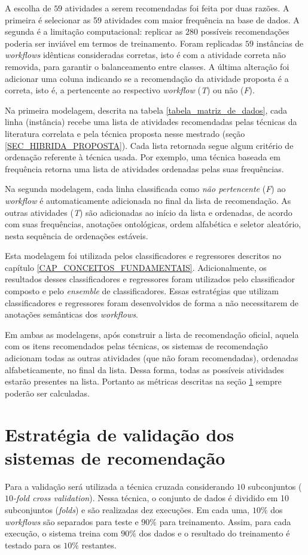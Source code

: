 A escolha de \(59\) atividades a serem recomendadas foi feita por duas razões. A primeira é selecionar as 59 atividades com maior frequência na base de dados. A segunda é a limitação computacional: replicar as \(280\) possíveis recomendações poderia ser inviável em termos de treinamento. Foram replicadas \(59\) instâncias de \emph{workflows} idênticas consideradas corretas, isto é com a atividade correta não removida, para garantir o balanceamento entre classes. A última alteração foi adicionar uma coluna indicando se a recomendação da atividade proposta é a correta, isto é, a pertencente ao respectivo \emph{workflow} (\emph{T}) ou não (\emph{F}).

Na primeira modelagem, descrita na tabela \ref{tabela_matriz_de_dados}, cada linha (instância) recebe uma lista de atividades recomendadas pelas técnicas da literatura correlata e pela técnica proposta nesse mestrado (seção \ref{SEC_HIBRIDA_PROPOSTA}). Cada lista retornada segue algum critério de ordenação referente à técnica usada. Por exemplo, uma técnica baseada em frequência retorna uma lista de atividades ordenadas pelas suas frequências. 

Na segunda modelagem, cada linha classificada como \emph{não pertencente} (\emph{F}) ao \emph{workflow} é automaticamente adicionada no final da lista de recomendação. As outras atividades (\emph{T}) são adicionadas ao início da lista e ordenadas, de acordo com suas frequências, anotações ontológicas, ordem alfabética e seletor aleatório, nesta sequência de ordenações estáveis.

Esta modelagem foi utilizada pelos classificadores e regressores descritos no capítulo \ref{CAP_CONCEITOS_FUNDAMENTAIS}. Adicionalmente, os resultados desses classificadores e regressores foram utilizados pelo classificador composto e pelo \emph{ensemble} de classificadores. Essas estratégias que utilizam classificadores e regressores foram desenvolvidos de forma a não necessitarem de anotações semânticas dos \emph{workflows}.

Em ambas as modelagens, após construir a lista de recomendação oficial, aquela com os itens recomendados pelas técnicas, os sistemas de recomendação adicionam todas as outras atividades (que não foram recomendadas), ordenadas alfabeticamente, no final da lista. Dessa forma, todas as possíveis atividades estarão presentes na lista. Portanto as métricas descritas na seção \ref{SEC_METRICAS_VALIDACAO} sempre poderão ser calculadas.

\section{Estratégia de validação dos sistemas de recomendação} \label{SEC_METRICAS_VALIDACAO}
Para a validação será utilizada a técnica cruzada considerando \(10\) subconjuntos (\emph{\(10\)-fold cross validation}). Nessa técnica, o conjunto de dados é dividido em 10 subconjuntos (\emph{folds}) e são realizadas dez execuções. Em cada uma, \(10\%\) dos \emph{workflows} são separados para teste e \(90\%\) para treinamento. Assim, para cada execução, o sistema treina com \(90\%\) dos dados e o resultado do treinamento é testado para os \(10\%\) restantes. 

